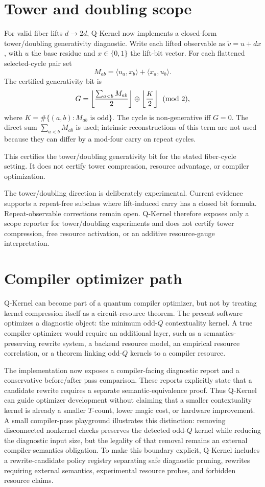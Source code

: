 \documentclass[11pt]{article}
\begin{document}
\section{Tower and doubling scope}

For valid fiber lifts \(d\to 2d\), Q-Kernel now implements a closed-form tower/doubling generativity diagnostic.  Write each lifted observable as \(\tilde v=u+d x\), with \(u\) the base residue and \(x\in\{0,1\}\) the lift-bit vector.  For each flattened selected-cycle pair set
\[
  M_{ab}=\langle u_a,x_b\rangle+\langle x_a,u_b\rangle.
\]
The certified generativity bit is
\[
  G=\left\lfloor{\sum_{a<b}M_{ab}\over 2}\right\rfloor
    \oplus
    \left\lfloor{K\over 2}\right\rfloor
    \pmod 2,
\]
where \(K=\#\{(a,b):M_{ab}\text{ is odd}\}\).  The cycle is non-generative iff \(G=0\).  The direct sum \(\sum_{a<b}M_{ab}\) is used; intrinsic reconstructions of this term are not used because they can differ by a mod-four carry on repeat cycles.

This certifies the tower/doubling generativity bit for the stated fiber-cycle setting.  It does not certify tower compression, resource advantage, or compiler optimization.



The tower/doubling direction is deliberately experimental.  Current evidence supports a repeat-free subclass where lift-induced carry has a closed bit formula.  Repeat-observable corrections remain open.  Q-Kernel therefore exposes only a scope reporter for tower/doubling experiments and does not certify tower compression, free resource activation, or an additive resource-gauge interpretation.


\section{Compiler optimizer path}

Q-Kernel can become part of a quantum compiler optimizer, but not by treating kernel compression itself as a circuit-resource theorem.  The present software optimizes a diagnostic object: the minimum odd-\(Q\) contextuality kernel.  A true compiler optimizer would require an additional layer, such as a semantics-preserving rewrite system, a backend resource model, an empirical resource correlation, or a theorem linking odd-\(Q\) kernels to a compiler resource.

The implementation now exposes a compiler-facing diagnostic report and a conservative before/after pass comparison.  These reports explicitly state that a candidate rewrite requires a separate semantic-equivalence proof.  Thus Q-Kernel can guide optimizer development without claiming that a smaller contextuality kernel is already a smaller \(T\)-count, lower magic cost, or hardware improvement.  A small compiler-pass playground illustrates this distinction: removing disconnected nonkernel checks preserves the detected odd-\(Q\) kernel while reducing the diagnostic input size, but the legality of that removal remains an external compiler-semantics obligation.  To make this boundary explicit, Q-Kernel includes a rewrite-candidate policy registry separating safe diagnostic pruning, rewrites requiring external semantics, experimental resource probes, and forbidden resource claims.
\end{document}
